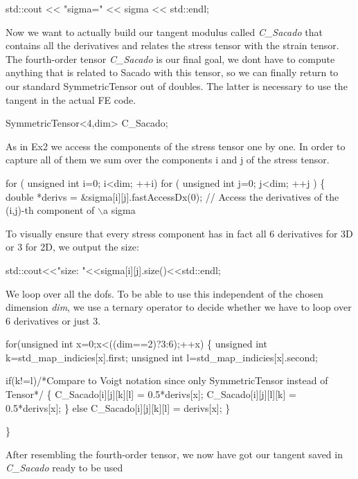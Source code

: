\begin{DoxyCode}
std::cout << \textcolor{stringliteral}{"sigma="} << sigma << std::endl;
\end{DoxyCode}
 Now we want to actually build our tangent modulus called {\itshape C\+\_\+\+Sacado} that contains all the derivatives and relates the stress tensor with the strain tensor. ~\newline
The fourth-\/order tensor {\itshape C\+\_\+\+Sacado} is our final goal, we don\textquotesingle{}t have to compute anything that is related to Sacado with this tensor, so we can finally return to our standard Symmetric\+Tensor out of doubles. The latter is necessary to use the tangent in the actual FE code. 
\begin{DoxyCode}
SymmetricTensor<4,dim> C\_Sacado;
\end{DoxyCode}
 As in Ex2 we access the components of the stress tensor one by one. In order to capture all of them we sum over the components i and j of the stress tensor. 
\begin{DoxyCode}
\textcolor{keywordflow}{for} ( \textcolor{keywordtype}{unsigned} \textcolor{keywordtype}{int} i=0; i<dim; ++i)
    \textcolor{keywordflow}{for} ( \textcolor{keywordtype}{unsigned} \textcolor{keywordtype}{int} j=0; j<dim; ++j )
    \{
        \textcolor{keywordtype}{double} *derivs = &sigma[i][j].fastAccessDx(0); \textcolor{comment}{// Access the derivatives of the (i,j)-th component
       of \(\backslash\)a sigma}
\end{DoxyCode}
 To visually ensure that every stress component has in fact all 6 derivatives for 3D or 3 for 2D, we output the size\+: 
\begin{DoxyCode}
std::cout<<\textcolor{stringliteral}{"size: "}<<sigma[i][j].size()<<std::endl;
\end{DoxyCode}
 We loop over all the dofs. To be able to use this independent of the chosen dimension {\itshape dim}, we use a ternary operator to decide whether we have to loop over 6 derivatives or just 3. 
\begin{DoxyCode}
    \textcolor{keywordflow}{for}(\textcolor{keywordtype}{unsigned} \textcolor{keywordtype}{int} x=0;x<((dim==2)?3:6);++x)
    \{
        \textcolor{keywordtype}{unsigned} \textcolor{keywordtype}{int} k=std\_map\_indicies[x].first;
        \textcolor{keywordtype}{unsigned} \textcolor{keywordtype}{int} l=std\_map\_indicies[x].second;

        \textcolor{keywordflow}{if}(k!=l)\textcolor{comment}{/*Compare to Voigt notation since only SymmetricTensor instead of Tensor*/}
        \{
            C\_Sacado[i][j][k][l] = 0.5*derivs[x];
            C\_Sacado[i][j][l][k] = 0.5*derivs[x];
        \}
        \textcolor{keywordflow}{else}
            C\_Sacado[i][j][k][l] = derivs[x];
    \}            

\}
\end{DoxyCode}
 After resembling the fourth-\/order tensor, we now have got our tangent saved in {\itshape C\+\_\+\+Sacado} ready to be used

